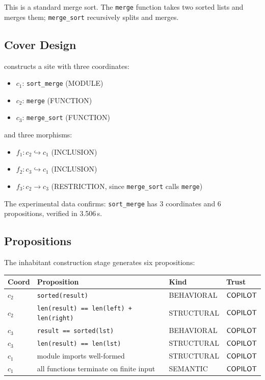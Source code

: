 \documentclass[11pt]{article}
\begin{document}
This is a standard merge sort.  The \texttt{merge} function takes
two sorted lists and merges them; \texttt{merge\_sort} recursively
splits and merges.

\subsection{Cover Design}

\JuGeo{} constructs a site with three coordinates:
\begin{itemize}
  \item $c_1$: \texttt{sort\_merge} (MODULE)
  \item $c_2$: \texttt{merge} (FUNCTION)
  \item $c_3$: \texttt{merge\_sort} (FUNCTION)
\end{itemize}
and three morphisms:
\begin{itemize}
  \item $f_1 : c_2 \hookrightarrow c_1$ (INCLUSION)
  \item $f_2 : c_3 \hookrightarrow c_1$ (INCLUSION)
  \item $f_3 : c_2 \to c_3$ (RESTRICTION, since \texttt{merge\_sort}
    calls \texttt{merge})
\end{itemize}

The experimental data confirms: \texttt{sort\_merge} has 3 coordinates
and 6 propositions, verified in 3.506\,s.

\subsection{Propositions}

The inhabitant construction stage generates six propositions:

\begin{center}
\begin{tabular}{@{}llll@{}}
\toprule
\textbf{Coord} & \textbf{Proposition} & \textbf{Kind} & \textbf{Trust} \\
\midrule
$c_2$ & \texttt{sorted(result)} & BEHAVIORAL & $\mathsf{COPILOT}$ \\
$c_2$ & \texttt{len(result) == len(left) + len(right)} & STRUCTURAL & $\mathsf{COPILOT}$ \\
$c_3$ & \texttt{result == sorted(lst)} & BEHAVIORAL & $\mathsf{COPILOT}$ \\
$c_3$ & \texttt{len(result) == len(lst)} & STRUCTURAL & $\mathsf{COPILOT}$ \\
$c_1$ & module imports well-formed & STRUCTURAL & $\mathsf{COPILOT}$ \\
$c_1$ & all functions terminate on finite input & SEMANTIC & $\mathsf{COPILOT}$ \\
\bottomrule
\end{tabular}
\end{center}
\end{document}
